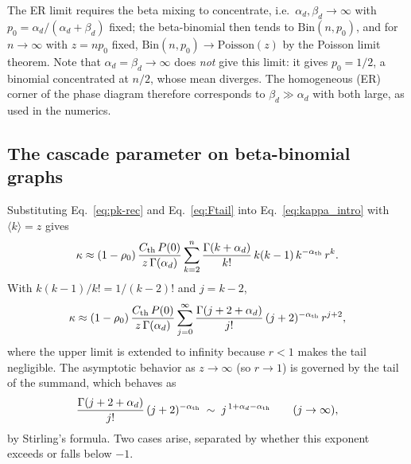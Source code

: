 \documentclass[]{revtex4-2}
\begin{document}
The ER limit requires the beta mixing to concentrate, i.e.\ $\alpha_d,\beta_d\to\infty$ with $p_0=\alpha_d/(\alpha_d+\beta_d)$ fixed; the beta-binomial then tends to $\mathrm{Bin}(n,p_0)$, and for $n\to\infty$ with $z=np_0$ fixed, $\mathrm{Bin}(n,p_0)\to\mathrm{Poisson}(z)$ by the Poisson limit theorem. Note that $\alpha_d=\beta_d\to\infty$ does \emph{not} give this limit: it gives $p_0=1/2$, a binomial concentrated at $n/2$, whose mean diverges. The homogeneous (ER) corner of the phase diagram therefore corresponds to $\beta_d\gg\alpha_d$ with both large, as used in the numerics.

\subsection{The cascade parameter on beta-binomial graphs}

Substituting Eq.~\eqref{eq:pk-rec} and Eq.~\eqref{eq:Ftail} into Eq.~\eqref{eq:kappa_intro} with $\langle k\rangle=z$ gives
\begin{equation}
    \kappa \approx (1-\rho_0)\,\frac{C_{\rm th}\,P(0)}{z\,\Gamma(\alpha_d)}
    \sum_{k=2}^{n}\frac{\Gamma(k+\alpha_d)}{k!}\,k(k-1)\,k^{-\alpha_{\rm th}}\,r^k .
\end{equation}
With $k(k-1)/k! = 1/(k-2)!$ and $j=k-2$,
\begin{equation}
    \kappa \approx (1-\rho_0)\,\frac{C_{\rm th}\,P(0)}{z\,\Gamma(\alpha_d)}
    \sum_{j=0}^{\infty} \frac{\Gamma(j+2+\alpha_d)}{j!}\,(j+2)^{-\alpha_{\rm th}}\,r^{j+2},
    \label{eq:bb-kappa-asym}
\end{equation}
where the upper limit is extended to infinity because $r<1$ makes the tail negligible. The asymptotic behavior as $z\to\infty$ (so $r\to1$) is governed by the tail of the summand, which behaves as
\begin{equation}
    \frac{\Gamma(j+2+\alpha_d)}{j!}\,(j+2)^{-\alpha_{\rm th}}
    \;\sim\; j^{\,1+\alpha_d-\alpha_{\rm th}}
    \qquad (j\to\infty),
\end{equation}
by Stirling's formula. Two cases arise, separated by whether this exponent exceeds or falls below $-1$.
\end{document}
